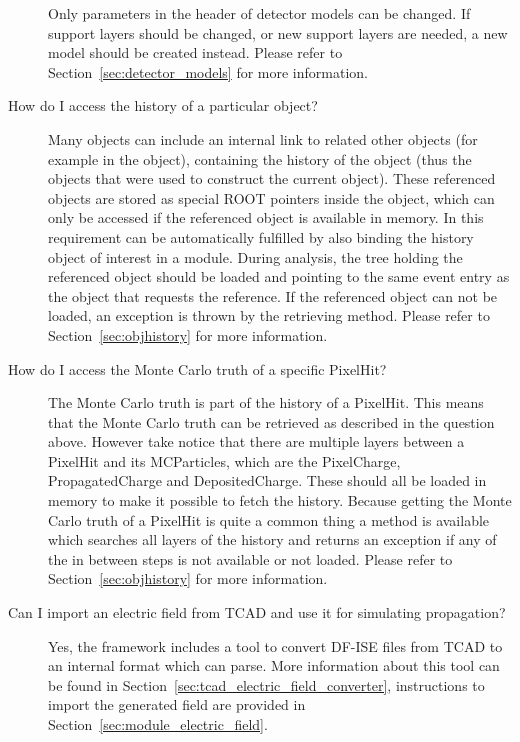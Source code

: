 \begin{description}
Only parameters in the header of detector models can be changed.
If support layers should be changed, or new support layers are needed, a new model should be created instead.
Please refer to Section~\ref{sec:detector_models} for more information.
\item[How do I access the history of a particular object?]
Many objects can include an internal link to related other objects (for example  in the  object), containing the history of the object (thus the objects that were used to construct the current object).
These referenced objects are stored as special ROOT pointers inside the object, which can only be accessed if the referenced object is available in memory.
In \apsq this requirement can be automatically fulfilled by also binding the history object of interest in a module.
During analysis, the tree holding the referenced object should be loaded and pointing to the same event entry as the object that requests the reference.
If the referenced object can not be loaded, an exception is thrown by the retrieving method.
Please refer to Section~\ref{sec:objhistory} for more information.
\item[How do I access the Monte Carlo truth of a specific PixelHit?]
The Monte Carlo truth is part of the history of a PixelHit.
This means that the Monte Carlo truth can be retrieved as described in the question above.
However take notice that there are multiple layers between a PixelHit and its MCParticles, which are the PixelCharge, PropagatedCharge and DepositedCharge.
These should all be loaded in memory to make it possible to fetch the history.
Because getting the Monte Carlo truth of a PixelHit is quite a common thing a  method is available which searches all layers of the history and returns an exception if any of the in between steps is not available or not loaded.
Please refer to Section~\ref{sec:objhistory} for more information.
\item[Can I import an electric field from TCAD and use it for simulating propagation?]
Yes, the framework includes a tool to convert DF-ISE files from TCAD to an internal format which \apsq can parse.
More information about this tool can be found in Section~\ref{sec:tcad_electric_field_converter}, instructions to import the generated field are provided in Section~\ref{sec:module_electric_field}.
\end{description}

